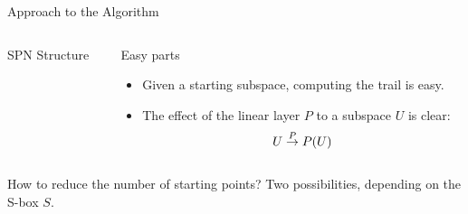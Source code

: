 \begin{frame}{Approach to the Algorithm}
\begin{columns}[t,onlytextwidth]
\begin{column}{0.6\textwidth}
\begin{block}{SPN Structure\vphantom{y}}
                \vspace{0.5em}
            \end{block}
        \end{column}
        \begin{column}{0.3325\textwidth}
            \begin{block}{Easy parts}
                \vspace{4mm}
                \begin{itemize}
                    \item Given a starting subspace, computing the trail is easy.
                    \item The effect of the linear layer $P$ to a subspace $U$ is clear:
                          \begin{equation*}
                              U \stackrel{P}{\rightarrow} P(U)
                          \end{equation*}
                \end{itemize}
                \vspace{3.75mm}
            \end{block}
        \end{column}
    \end{columns}
    \begin{minipage}{0.979\textwidth}
    \begin{block}{How to reduce the number of starting points?}
        Two possibilities, depending on the S-box $S$.
    \end{block}
    \end{minipage}
\end{frame}

